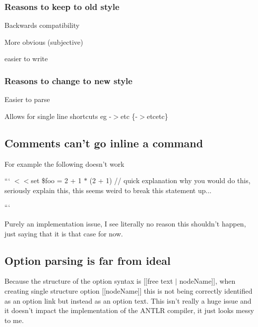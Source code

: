 \subsubsection*{Reasons to keep to old style}


\begin{DoxyItemize}
\item Backwards compatibility
\item More obvious (subjective)
\item easier to write
\end{DoxyItemize}

\subsubsection*{Reasons to change to new style}


\begin{DoxyItemize}
\item Easier to parse
\item Allows for single line shortcuts eg -\/$>$etc \{-\/$>$etcetc\}
\end{DoxyItemize}

\subsection*{Comments can't go inline a command}

For example the following doesn't work

``` $<$$<$set \$foo = 2 + 1 $\ast$ (2 + 1) // quick explanation why you would do this, seriously explain this, this seems weird to break this statement up... \begin{quotation}
\begin{quotation}


\end{quotation}


\end{quotation}
```

Purely an implementation issue, I see literally no reason this shouldn't happen, just saying that it is that case for now.

\subsection*{Option parsing is far from ideal}

Because the structure of the option syntax is {\ttfamily \mbox{[}\mbox{[}free text $\vert$ node\-Name\mbox{]}\mbox{]}}, when creating single structure option {\ttfamily \mbox{[}\mbox{[}node\-Name\mbox{]}\mbox{]}} this is not being correctly identified as an option link but instead as an option text. This isn't really a huge issue and it doesn't impact the implementation of the A\-N\-T\-L\-R compiler, it just looks messy to me.

